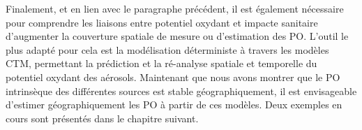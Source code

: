 Finalement, et en lien avec le paragraphe précédent, il est également nécessaire pour comprendre les liaisons entre potentiel oxydant et impacte sanitaire d'augmenter la couverture spatiale de mesure ou d'estimation des PO. L'outil le plus adapté pour cela est la modélisation déterministe à travers les modèles CTM, permettant la prédiction et la ré-analyse spatiale et temporelle du potentiel oxydant des aérosols. Maintenant que nous avons montrer que le PO intrinsèque des différentes sources est stable géographiquement, il est envisageable d'estimer géographiquement les PO à partir de ces modèles. Deux exemples en cours sont présentés dans le chapitre suivant.
